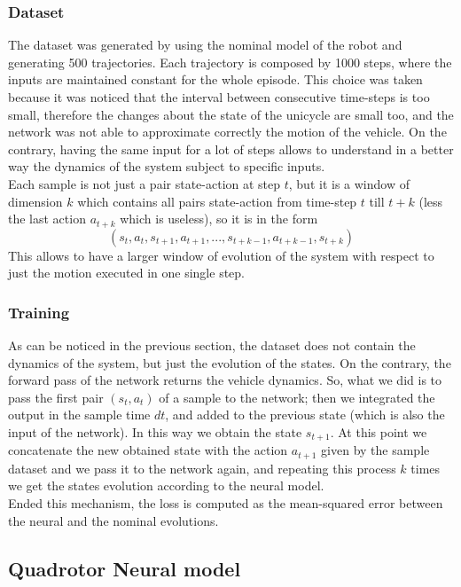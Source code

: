 \subsubsection{Dataset}
The dataset was generated by using the nominal model of the robot and
generating 500 trajectories. Each trajectory is composed by 1000 steps,
where the inputs are maintained constant for the whole episode. This choice
was taken because it was noticed that the interval between consecutive
time-steps is too small, therefore the changes about the state of the
unicycle are small too, and the network was not able to approximate
correctly the motion of the vehicle. On the contrary, having the same input
for a lot of steps allows to understand in a better way the dynamics of the
system subject to specific inputs. \\
Each sample is not just a pair state-action at step $t$, but it is a window of dimension $k$ which contains
all pairs state-action from time-step $t$ till $t+k$ (less the last action $a_{t+k}$ which is useless), 
so it is in the form 
\begin{equation}
    (s_t, a_t, s_{t+1}, a_{t+1}, ..., s_{t+k-1}, a_{t+k-1}, s_{t+k})
\end{equation}
This allows to have a larger window of evolution of the system with respect to just the motion executed in
one single step. 


\subsubsection{Training}

As can be noticed in the previous section, the dataset does not contain the dynamics of the system, 
but just the evolution of the states. On the contrary, the forward pass of the network returns
the vehicle dynamics. So, what we did is to pass the first pair $(s_t, a_t)$ of a sample to the 
network; then we integrated the output in the sample time $dt$, 
and added to the previous state (which is also the input of the network).
In this way we obtain the state $s_{t+1}$.
At this point we concatenate the new obtained state with the action $a_{t+1}$ given by the sample dataset
and we pass it to the network again, and repeating
this process $k$ times we get the states evolution according to the neural model. \\
Ended this mechanism, the loss is computed as the mean-squared error between the neural and the nominal evolutions. 


\subsection{Quadrotor Neural model}

